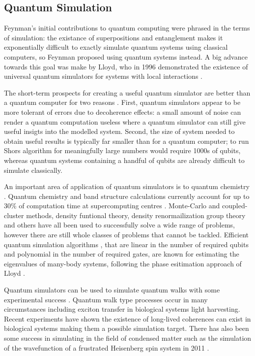 \subsection{Quantum Simulation}

Feynman's initial contributions to quantum computing \cite{feynman_81} were phrased in the terms of simulation: the existance of superpositions and entanglement makes it exponentially difficult to exactly simulate quantum systems using classical computers, so Feynman proposed using quantum systems instead. A big advance towards this goal was make by Lloyd, who in 1996 demonstrated the existence of universal quantum simulators for systems with local interactions \cite{lloyd_universal_simulators}.

The short-term prospects for creating a useful quantum simulator are better than a quantum computer for two reasons \cite{simulation_ion_review}. First, quantum simulators appear to be more tolerant of errors due to decoherence effects: a small amount of noise can render a quantum computation useless where a quantum simulator can still give useful insigts into the modelled system. Second, the size of system needed to obtain useful results is typically far smaller than for a quantum computer; to run Shors algorithm for meaningfully large numbers would require 1000s of qubits, whereas quantum systems containing a handful of qubits are already difficult to simulate classically.


An important area of application of quantum simulators is to quantum chemistry \cite{science_quantum_simulator_review_09}. Quantum chemistry and band structure calculations currently account for up to 30\% of computation time at supercomputing centres \cite{simulation_photon_review, supercomputer_report_10}. Monte-Carlo and coupled-cluster methods, density funtional theory, density renormailization group theory and others have all been used to successfully solve a wide range of problems, however there are still whole classes of problems that cannot be tackled. Efficient quantum simulation algorithms \cite{quantum_chem_alg_05, simulation_hamiltonians_11}, that are linear in the number of required qubits and polynomial in the number of required gates, are known for estimating the eigenvalues of many-body systems, following the phase esitimation approach of Lloyd \cite{lloyd_simulate_eigenvalues_99, lloyd_simulate_many_body_97}.

Quantum simulators can be used to simulate quantum walks \cite{farhi_quantum_walks_98} with some experimental success \cite{quantum_walks_simulated_08}. Quantum walk type processes occur in many circumstances including exciton transfer in biological systems light harvesting. Recent experiments have shown the existence of long-lived coherences can exist in biological systems \cite{quant_bio_coherences_1, quant_bio_coherences_2, quant_bio_coherences_3} making them a possible simulation target. There has also been some success in simulating in the field of condensed matter such as the simulation of the wavefunction of a frustrated Heisenberg spin system in 2011 \cite{simulation_frustrated_spins_11}.


